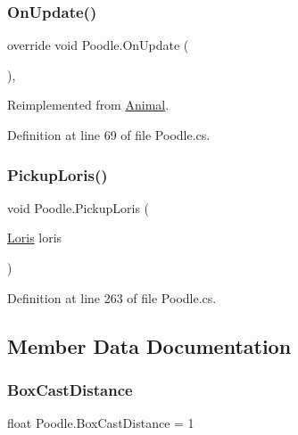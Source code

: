 \subsubsection{\texorpdfstring{On\+Update()}{OnUpdate()}}
{\footnotesize\ttfamily override void Poodle.\+On\+Update (\begin{DoxyParamCaption}{ }\end{DoxyParamCaption})\hspace{0.3cm}{\ttfamily [protected]}, {\ttfamily [virtual]}}



Reimplemented from \mbox{\hyperlink{class_animal_a0b0cf85dbc03ad6ed1878e90c2ac84b1}{Animal}}.



Definition at line 69 of file Poodle.\+cs.

\mbox{\label{class_poodle_aea810427376cee41f4e99fc020c50d70}} 
\subsubsection{\texorpdfstring{Pickup\+Loris()}{PickupLoris()}}
{\footnotesize\ttfamily void Poodle.\+Pickup\+Loris (\begin{DoxyParamCaption}\item[{\mbox{\hyperlink{class_loris}{Loris}}}]{loris }\end{DoxyParamCaption})}



Definition at line 263 of file Poodle.\+cs.



\subsection{Member Data Documentation}
\mbox{\label{class_poodle_a8ce5f871336e0b20db5e56f59044cf2e}} 
\subsubsection{\texorpdfstring{Box\+Cast\+Distance}{BoxCastDistance}}
{\footnotesize\ttfamily float Poodle.\+Box\+Cast\+Distance = 1}



